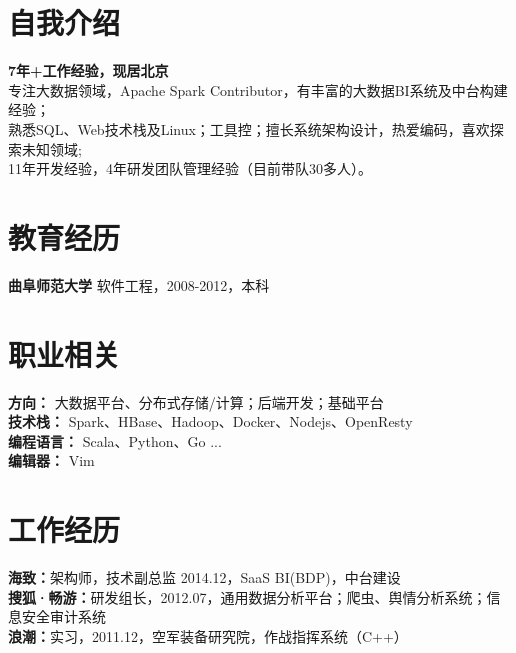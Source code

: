 \documentclass[UTF8,margin,line]{res}
\begin{document}

\begin{resume}

\section{\sc 自我介绍}
\textbf{7年+工作经验，现居北京} \\
专注大数据领域，Apache Spark Contributor，有丰富的大数据BI系统及中台构建经验； \\
熟悉SQL、Web技术栈及Linux；工具控；擅长系统架构设计，热爱编码，喜欢探索未知领域; \\
11年开发经验，4年研发团队管理经验（目前带队30多人）。

\section{\sc 教育经历}
\textbf{曲阜师范大学} 软件工程，2008-2012，本科

\section{\sc 职业相关}
\textbf{方向：} 大数据平台、分布式存储/计算；后端开发；基础平台 \\
\textbf{技术栈：} Spark、HBase、Hadoop、Docker、Nodejs、OpenResty \\
\textbf{编程语言：} Scala、Python、Go ... \\
\textbf{编辑器：} Vim

\section{\sc 工作经历}
\textbf{海致：}架构师，技术副总监 2014.12，SaaS BI(BDP)，中台建设 \\
\textbf{搜狐·畅游：}研发组长，2012.07，通用数据分析平台；爬虫、舆情分析系统；信息安全审计系统 \\
\textbf{浪潮：}实习，2011.12，空军装备研究院，作战指挥系统（C++）


\end{resume}
\end{document}
